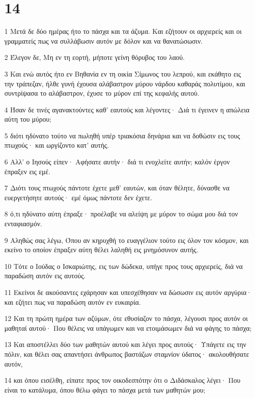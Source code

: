 \chapter{14}

\par 1 Μετά δε δύο ημέρας ήτο το πάσχα και τα άζυμα. Και εζήτουν οι αρχιερείς και οι γραμματείς πως να συλλάβωσιν αυτόν με δόλον και να θανατώσωσιν.
\par 2 Έλεγον δε, Μη εν τη εορτή, μήποτε γείνη θόρυβος του λαού.
\par 3 Και ενώ αυτός ήτο εν Βηθανία εν τη οικία Σίμωνος του λεπρού, και εκάθητο εις την τράπεζαν, ήλθε γυνή έχουσα αλάβαστρον μύρου νάρδου καθαράς πολυτίμου, και συντρίψασα το αλάβαστρον, έχυσε το μύρον επί της κεφαλής αυτού.
\par 4 Ήσαν δε τινές αγανακτούντες καθ' εαυτούς και λέγοντες· Διά τι έγεινεν η απώλεια αύτη του μύρου;
\par 5 διότι ηδύνατο τούτο να πωληθή υπέρ τριακόσια δηνάρια και να δοθώσιν εις τους πτωχούς· και ωργίζοντο κατ' αυτής.
\par 6 Αλλ' ο Ιησούς είπεν· Αφήσατε αυτήν· διά τι ενοχλείτε αυτήν; καλόν έργον έπραξεν εις εμέ.
\par 7 Διότι τους πτωχούς πάντοτε έχετε μεθ' εαυτών, και όταν θέλητε, δύνασθε να ευεργετήσητε αυτούς· εμέ όμως πάντοτε δεν έχετε.
\par 8 ό,τι ηδύνατο αύτη έπραξε· προέλαβε να αλείψη με μύρον το σώμα μου διά τον ενταφιασμόν.
\par 9 Αληθώς σας λέγω, Όπου αν κηρυχθή το ευαγγέλιον τούτο εις όλον τον κόσμον, και εκείνο το οποίον έπραξεν αύτη θέλει λαληθή εις μνημόσυνον αυτής.
\par 10 Τότε ο Ιούδας ο Ισκαριώτης, εις των δώδεκα, υπήγε προς τους αρχιερείς, διά να παραδώση αυτόν εις αυτούς.
\par 11 Εκείνοι δε ακούσαντες εχάρησαν και υπεσχέθησαν να δώσωσιν εις αυτόν αργύρια· και εζήτει πως να παραδώση αυτόν εν ευκαιρία.
\par 12 Και τη πρώτη ημέρα των αζύμων, ότε εθυσίαζον το πάσχα, λέγουσι προς αυτόν οι μαθηταί αυτού· Που θέλεις να υπάγωμεν και να ετοιμάσωμεν διά να φάγης το πάσχα;
\par 13 Και αποστέλλει δύο των μαθητών αυτού και λέγει προς αυτούς· Υπάγετε εις την πόλιν, και θέλει σας απαντήσει άνθρωπος βαστάζων σταμνίον ύδατος· ακολουθήσατε αυτόν,
\par 14 και όπου εισέλθη, είπατε προς τον οικοδεσπότην ότι ο Διδάσκαλος λέγει· Που είναι το κατάλυμα, όπου θέλω φάγει το πάσχα μετά των μαθητών μου;
